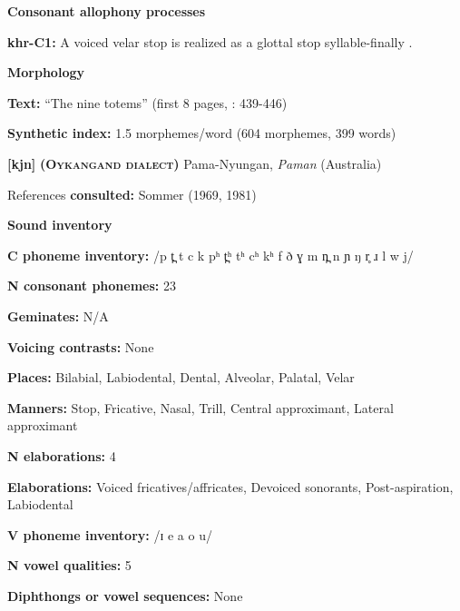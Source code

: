 \textbf{Consonant allophony processes}



\textbf{khr-C1:} A voiced velar stop is realized as a glottal stop syllable-finally \citep[29]{Peterson2011}.



\textbf{Morphology}



\textbf{Text:} “The nine totems” (first 8 pages, \citealt{Peterson2011}: 439-446)



\textbf{Synthetic index:} 1.5 morphemes/word (604 morphemes, 399 words)



\textbf{[kjn]}   \textbf{\textsc{ (Oykangand dialect)}}  Pama-Nyungan, \textit{Paman} (Australia)



References \textbf{consulted:} Sommer (1969, 1981)



\textbf{Sound inventory}



\textbf{C phoneme inventory:} /p t̪ t c k pʰ t̪ʰ tʰ cʰ kʰ f ð ɣ m n̪ n ɲ ŋ r̥ ɹ l w j/



\textbf{N consonant phonemes:} 23



\textbf{Geminates:} N/A



\textbf{Voicing contrasts:} None



\textbf{Places:} Bilabial, Labiodental, Dental, Alveolar, Palatal, Velar



\textbf{Manners:} Stop, Fricative, Nasal, Trill, Central approximant, Lateral approximant



\textbf{N elaborations:} 4



\textbf{Elaborations:} Voiced fricatives/affricates, Devoiced sonorants, Post-aspiration, Labiodental



\textbf{V phoneme inventory:} /ɪ e a o u/



\textbf{N vowel qualities:} 5



\textbf{Diphthongs or vowel sequences:} None



